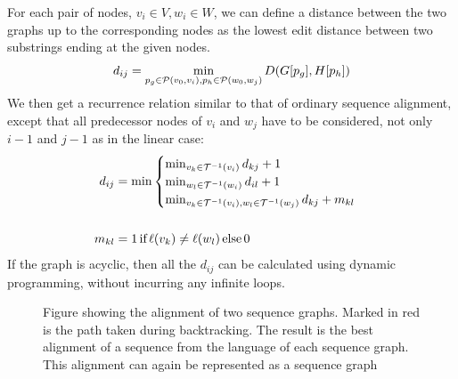 For each pair of nodes, $v_i \in V, w_i \in W$, we can define a distance between the two graphs up to the corresponding nodes as the lowest edit distance between two substrings ending at the given nodes.
\[
  d_{ij} = \min_{p_g \in \paths(v_0, v_i), p_h \in \paths(w_0, w_j)} D(G[p_g], H[p_h])
\]
We then get a recurrence relation similar to that of ordinary sequence alignment, except that all predecessor nodes of $v_i$ and $w_j$ have to be considered, not only $i-1$ and $j-1$ as in the linear case:
\begin{align*}
  d_{ij} &= \min \begin{cases}
    \min_{v_k \in \preds(v_i)} d_{kj} + 1\\
    \min_{w_l \in \preds(w_i)} d_{il} +1 \\
    \min_{v_k \in \preds(v_i), w_l \in \preds(w_j)} d_{kj}+m_{kl}\\
  \end{cases}\\
\\
    m_{kl} &= 1\, \text{if}\, \slabel(v_k) \neq \slabel(w_l)\, \text{else}\, 0\\    
\end{align*}
If the graph is acyclic, then all the $d_{ij}$ can be calculated using dynamic programming, without incurring any infinite loops.
\begin{figure}
  \begin{tikzpicture}
    
  \end{tikzpicture}
  \caption{
    Figure showing the alignment of two sequence graphs.
    Marked in red is the path taken during backtracking.
    The result is the best alignment of a sequence from the language of each sequence graph.
    This alignment can again be represented as a sequence graph}
    \label{fig:seqgrapha}
\end{figure}

